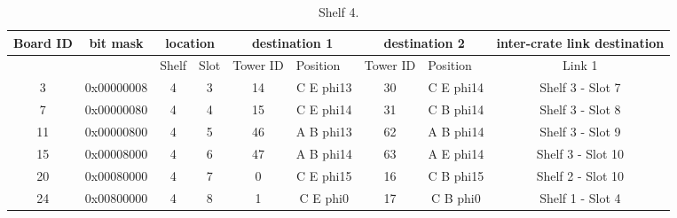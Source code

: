 \documentclass[11pt,letterpaper]{article}
\begin{document}
\begin{table}[]
\centering
\tiny
\caption{Shelf 4.}
\label{tab:shelf4}
\begin{tabular}{|c|c|c|c|c|c|c|c|c|}
\hline
Board ID               & bit mask              & \multicolumn{2}{c|}{location}                          & \multicolumn{2}{c|}{destination 1}                            & \multicolumn{2}{c|}{destination 2}                            & inter-crate link destination \\ \hline
\multicolumn{1}{|l|}{} & \multicolumn{1}{l|}{} & \multicolumn{1}{l|}{Shelf} & \multicolumn{1}{l|}{Slot} & \multicolumn{1}{l|}{Tower ID} & \multicolumn{1}{l|}{Position} & \multicolumn{1}{l|}{Tower ID} & \multicolumn{1}{l|}{Position} & Link 1                       \\ \hline
3                      & 0x00000008            & 4                          & 3                         & 14                            & C E phi13                     & 30                            & C E phi14                     & Shelf 3 - Slot 7             \\ \hline
7                      & 0x00000080            & 4                          & 4                         & 15                            & C E phi14                     & 31                            & C B phi14                     & Shelf 3 - Slot 8             \\ \hline
11                     & 0x00000800            & 4                          & 5                         & 46                            & A B phi13                     & 62                            & A B phi14                     & Shelf 3 - Slot 9             \\ \hline
15                     & 0x00008000            & 4                          & 6                         & 47                            & A B phi14                     & 63                            & A E phi14                     & Shelf 3 - Slot 10            \\ \hline
20                     & 0x00080000            & 4                          & 7                         & 0                             & C E phi15                     & 16                            & C B phi15                     & Shelf 2 - Slot 10            \\ \hline
24                     & 0x00800000            & 4                          & 8                         & 1                             & C E phi0                      & 17                            & C B phi0                      & Shelf 1 - Slot 4             \\ \hline

\end{tabular}
\end{table}
\end{document}
